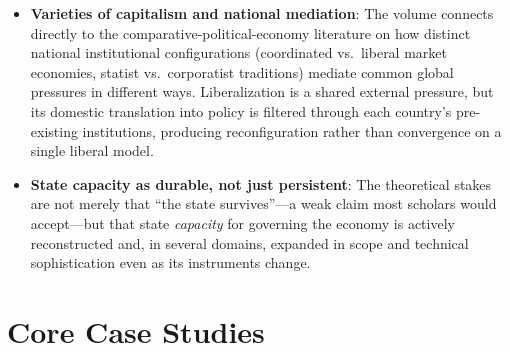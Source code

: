 \documentclass[12pt]{article}
\begin{document}
\begin{itemize}[leftmargin=*, itemsep=4pt]
    \item \textbf{Varieties of capitalism and national mediation}: The volume connects directly to the comparative-political-economy literature on how distinct national institutional configurations (coordinated vs.\ liberal market economies, statist vs.\ corporatist traditions) mediate common global pressures in different ways. Liberalization is a shared external pressure, but its domestic translation into policy is filtered through each country's pre-existing institutions, producing reconfiguration rather than convergence on a single liberal model.
    \item \textbf{State capacity as durable, not just persistent}: The theoretical stakes are not merely that ``the state survives''---a weak claim most scholars would accept---but that state \emph{capacity} for governing the economy is actively reconstructed and, in several domains, expanded in scope and technical sophistication even as its instruments change.
\end{itemize}

\section{Core Case Studies}
\end{document}
